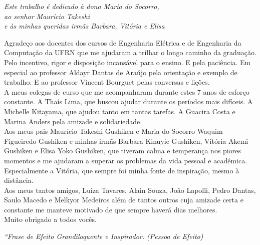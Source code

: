 \documentclass[
	12pt,				%
	openright,			%
	twoside,			%
	a4paper,			%
	english,			%
	french,				%
	spanish,			%
	brazil				%
	]{abntex2}
\begin{document}
\begin{dedicatoria}
\thispagestyle{simple}
   \vspace*{\fill}
   \centering
   \noindent
   \textit{ Este trabalho é dedicado à dona Maria do Socorro,\\
   ao senhor Maurício Takeshi\\
   e às minhas queridas irmãs Barbara, Vitória e Elisa} \vspace*{\fill}
\end{dedicatoria}

\begin{agradecimentos}
\thispagestyle{simple}
Agradeço aos docentes dos cursos de Engenharia Elétrica e de Engenharia da Computação da UFRN que me ajudaram a trilhar o longo caminho da graduação. Pelo incentivo, rigor e disposição incansável para o ensino. E pela paciência. Em especial ao professor Aldayr Dantas de Araújo pela orientação e exemplo de trabalho. E ao professor Vincent Bourguet pelas conversas e lições.\\

A meus colegas de curso que me acompanharam durante estes 7 anos de esforço constante. A Thaís Lima, que buscou ajudar durante os períodos mais difíceis. A Michelle Kitayama, que ajudou tanto em tantas tarefas. A Guacira Costa e Marina Anders pela amizade e solidariedade.\\
  
Aos meus pais Maurício Takeshi Gushiken e Maria do Socorro Waquim Figueiredo Gushiken e minhas irmãs Barbara Kinuyie Gushiken, Vitória Akemi Gushiken e Elisa Yoko Gushiken, que tiveram calma e temperança nos piores momentos e me ajudaram a superar os problemas da vida pessoal e acadêmica. Especialmente a Vitória, que sempre foi minha fonte de inspiração, mesmo à distância.\\

Aos meus tantos amigos, Luiza Tavares, Alain Souza, João Lapolli, Pedro Dantas, Saulo Macedo e Melkyor Medeiros além de tantos outros cuja amizade certa e constante me manteve motivado de que sempre haverá dias melhores.\\

Muito obrigado a todos vocês.   

\end{agradecimentos}

\begin{epigrafe}
\thispagestyle{simple}
    \vspace*{\fill}
	\begin{flushright}
		\textit{``Frase de Efeito Grandiloquente e Inspirador.
		(Pessoa de Efeito)}
	\end{flushright}
\end{epigrafe}
\end{document}

